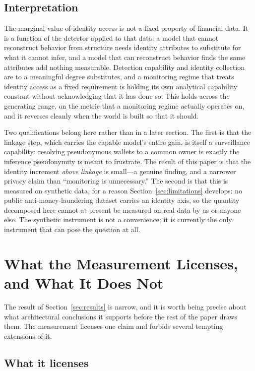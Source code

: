 \documentclass[11pt]{article}
\begin{document}
\subsection{Interpretation}
\label{sec:interpretation}

The marginal value of identity access is not a fixed property of financial data. It is a function of
the detector applied to that data: a model that cannot reconstruct behavior from structure needs
identity attributes to substitute for what it cannot infer, and a model that can reconstruct behavior
finds the same attributes add nothing measurable. Detection capability and identity collection are to
a meaningful degree substitutes, and a monitoring regime that treats identity access as a fixed
requirement is holding its own analytical capability constant without acknowledging that it has done
so. This holds across the generating range, on the metric that a monitoring regime actually operates
on, and it reverses cleanly when the world is built so that it should.

Two qualifications belong here rather than in a later section. The first is that the linkage step,
which carries the capable model's entire gain, is itself a surveillance capability: resolving
pseudonymous wallets to a common owner is exactly the inference pseudonymity is meant to frustrate.
The result of this paper is that the identity increment \emph{above linkage} is small---a genuine
finding, and a narrower privacy claim than ``monitoring is unnecessary.'' The second is that this is
measured on synthetic data, for a reason Section~\ref{sec:limitations} develops: no public
anti-money-laundering dataset carries an identity axis, so the quantity decomposed here cannot at
present be measured on real data by us or anyone else. The synthetic instrument is not a convenience;
it is currently the only instrument that can pose the question at all.
\section{What the Measurement Licenses, and What It Does Not}
\label{sec:licenses}

The result of Section~\ref{sec:results} is narrow, and it is worth being precise about what
architectural conclusions it supports before the rest of the paper draws them. The measurement
licenses one claim and forbids several tempting extensions of it.

\subsection{What it licenses}
\end{document}
